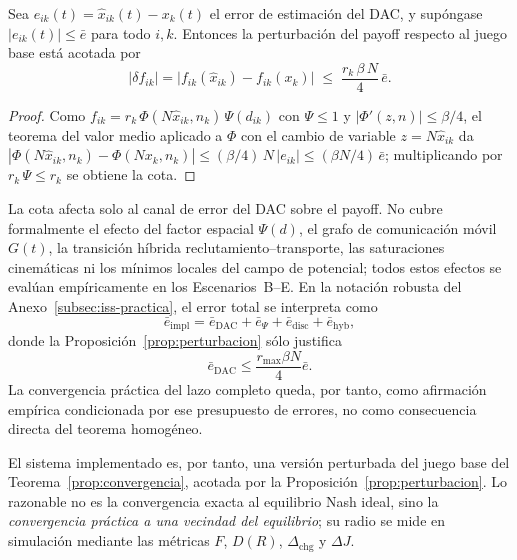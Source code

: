 \begin{proposicion}
\label{prop:perturbacion}
Sea $e_{ik}(t) = \hat{x}_{ik}(t) - x_k(t)$ el error de estimación del DAC, y
supóngase $|e_{ik}(t)| \leq \bar{e}$ para todo $i,k$. Entonces la perturbación del
payoff respecto al juego base está acotada por
\[
  |\delta f_{ik}| = \bigl|f_{ik}(\hat{x}_{ik}) - f_{ik}(x_k)\bigr|
    \;\leq\; \frac{r_k\,\beta\,N}{4}\,\bar{e}.
\]
\end{proposicion}
\begin{proof}
Como $f_{ik} = r_k\,\Phi(N\hat{x}_{ik},n_k)\,\Psi(d_{ik})$ con $\Psi \leq 1$ y
$|\Phi'(z,n)| \leq \beta/4$, el teorema del valor medio aplicado a $\Phi$ con el
cambio de variable $z = N\hat{x}_{ik}$ da
$|\Phi(N\hat{x}_{ik},n_k) - \Phi(Nx_k,n_k)| \leq (\beta/4)\,N\,|e_{ik}|
\leq (\beta N/4)\,\bar{e}$; multiplicando por $r_k\,\Psi \leq r_k$ se obtiene la cota.
\end{proof}

La cota afecta solo al canal de error del DAC sobre el payoff. No cubre
formalmente el efecto del factor espacial $\Psi(d)$, el grafo de comunicación móvil
$G(t)$, la transición híbrida reclutamiento--transporte, las saturaciones cinemáticas
ni los mínimos locales del campo de potencial; todos estos efectos se evalúan
empíricamente en los Escenarios~B--E.
En la notación robusta del Anexo~\ref{subsec:iss-practica}, el error total se interpreta
como
\[
  \bar e_{\mathrm{impl}}
  =
  \bar e_{\mathrm{DAC}}
  +
  \bar e_{\Psi}
  +
  \bar e_{\mathrm{disc}}
  +
  \bar e_{\mathrm{hyb}},
\]
donde la Proposición~\ref{prop:perturbacion} sólo justifica
\[
  \bar e_{\mathrm{DAC}}
  \le
  \frac{r_{\max}\beta N}{4}\bar e.
\]
La convergencia práctica del lazo completo queda, por tanto, como afirmación empírica
condicionada por ese presupuesto de errores, no como consecuencia directa del teorema
homogéneo.

El sistema implementado es, por tanto, una versión perturbada del juego base del
Teorema~\ref{prop:convergencia}, acotada por la Proposición~\ref{prop:perturbacion}. Lo
razonable no es la convergencia exacta al equilibrio Nash ideal, sino la
\emph{convergencia práctica a una vecindad del equilibrio}; su radio se mide en
simulación mediante las métricas $F$, $D(R)$, $\Delta_{\mathrm{chg}}$ y $\Delta J$.

